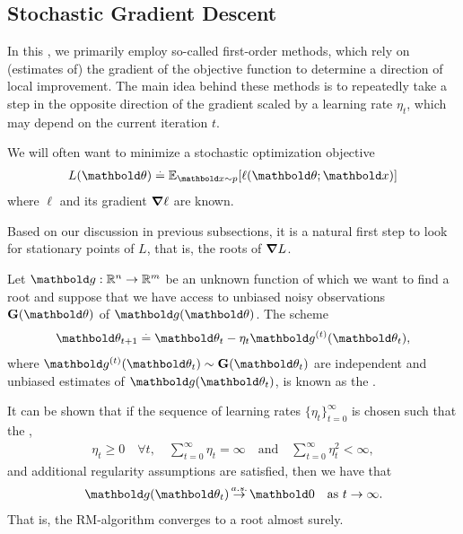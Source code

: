 \subsection{Stochastic Gradient Descent}

In this \course, we primarily employ so-called first-order methods, which rely on (estimates of) the gradient of the objective function to determine a direction of local improvement.
The main idea behind these methods is to repeatedly take a step in the opposite direction of the gradient scaled by a learning rate $\eta_t$, which may depend on the current iteration $t$.

We will often want to minimize a stochastic optimization objective \begin{align}
  L(\vtheta) \defeq \E[\vx \sim p]{\ell(\vtheta; \vx)}
\end{align} where $\ell$ and its gradient $\grad \ell$ are known.

Based on our discussion in previous subsections, it is a natural first step to look for stationary points of $L$, that is, the roots of $\grad L$.

\begin{thmb}
  \begin{fct}
    Let $\vg : \R^n \to \R^m$ be an unknown function of which we want to find a root and suppose that we have access to unbiased noisy observations $\rG(\vtheta)$ of $\vg(\vtheta)$.
    The scheme \begin{align}
      \vtheta_{t+1} \defeq \vtheta_t - \eta_t \vg^{(t)}(\vtheta_t),
    \end{align} where $\vg^{(t)}(\vtheta_t) \sim \rG(\vtheta_t)$ are independent and unbiased estimates of $\vg(\vtheta_t)$, is known as the .

    It can be shown that if the sequence of learning rates $\{\eta_t\}_{t=0}^\infty$ is chosen such that the , \begin{align}
      \eta_t \geq 0 \quad \forall t, \quad \sum_{t=0}^\infty \eta_t = \infty \quad\text{and}\quad \sum_{t=0}^\infty \eta_t^2 < \infty, \label{eq:rm_conditions}
    \end{align} and additional regularity assumptions are satisfied, then we have that \begin{align}
      \vg(\vtheta_t) \almostsurely \vzero \quad\text{as $t \to \infty$}.
    \end{align}
    That is, the RM-algorithm converges to a root almost surely.
  \end{fct}
\end{thmb}

